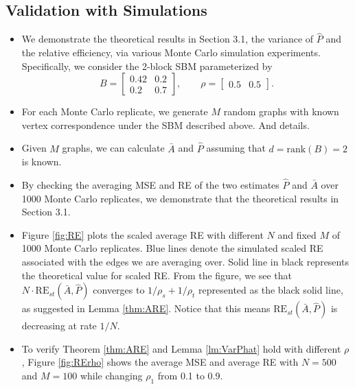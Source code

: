 \documentclass[a4paper]{article}
\begin{document}
\subsection{Validation with Simulations}
\begin{itemize}
\item We demonstrate the theoretical results in Section 3.1, the variance of $\hat{P}$ and the relative efficiency, via various Monte Carlo simulation experiments. Specifically, we consider the 2-block SBM parameterized by
\begin{equation*}
B = \begin{bmatrix}
0.42 & 0.2 \\
0.2 & 0.7
\end{bmatrix}
,\qquad \rho = \begin{bmatrix}
0.5 & 0.5
\end{bmatrix}.
\end{equation*}
\item For each Monte Carlo replicate, we generate $M$ random graphs with known vertex correspondence under the SBM described above. And details.
\item Given $M$ graphs, we can calculate $\bar{A}$ and $\hat{P}$ assuming that $d = \mathrm{rank}(B) = 2$ is known. 
\item By checking the averaging MSE and RE of the two estimates $\hat{P}$ and $\bar{A}$ over 1000 Monte Carlo replicates, we demonstrate that the theoretical results in Section 3.1.
\item Figure \ref{fig:RE} plots the scaled average RE with different $N$ and fixed $M$ of 1000 Monte Carlo replicates. Blue lines denote the simulated scaled RE associated with the edges we are averaging over. Solid line in black represents the theoretical value for scaled RE. From the figure, we see that $N \cdot \mathrm{RE}_{st}(\bar{A}, \hat{P})$ converges to $1/\rho_s + 1/\rho_t$ represented as the black solid line, as suggested in Lemma \ref{thm:ARE}. Notice that this means $\mathrm{RE}_{st}(\bar{A}, \hat{P})$ is decreasing at rate $1/N$.
\item To verify Theorem \ref{thm:ARE} and Lemma \ref{lm:VarPhat} hold with different $\rho$, Figure \ref{fig:RErho} shows the average MSE and average RE with $N = 500$ and $M = 100$ while changing $\rho_1$ from 0.1 to 0.9. 
\end{itemize}
\end{document}
